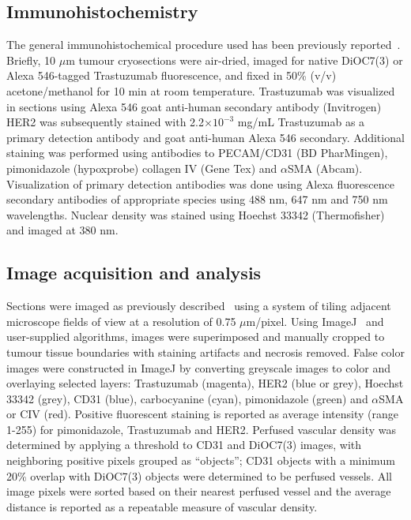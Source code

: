 \subsection{Immunohistochemistry}
The general immunohistochemical procedure used has been previously reported~\cite{Baker:2008ci}.
Briefly, 10 $\mu$m tumour cryosections were air-dried, imaged for native DiOC7(3) or Alexa 546-tagged Trastuzumab fluorescence, and fixed in 50\% (v/v) acetone/methanol for 10 min at room temperature.
Trastuzumab was visualized in sections using Alexa 546 goat anti-human secondary antibody (Invitrogen)
\acs{HER2} was subsequently stained with 2.2$\times 10^{-3}$ mg/mL Trastuzumab as a primary detection antibody and goat anti-human Alexa 546 secondary.
Additional staining was performed using antibodies to PECAM/CD31 (BD PharMingen), pimonidazole (hypoxprobe) collagen IV (Gene Tex) and $\alpha$SMA (Abcam).
Visualization of primary detection antibodies was done using Alexa fluorescence secondary antibodies of appropriate species using 488 nm, 647 nm and 750 nm wavelengths.
Nuclear density was stained using Hoechst 33342 (Thermofisher) and imaged at 380 nm.

\subsection{Image acquisition and analysis}
Sections were imaged as previously described~\cite{Kyle:2007ch} using a system of tiling adjacent microscope fields of view at a resolution of 0.75 $\mu$m/pixel.
Using ImageJ~\cite{Collins:2007jr} and user-supplied algorithms, images were superimposed and manually cropped to tumour tissue boundaries with staining artifacts and necrosis removed.
False color images were constructed in ImageJ by converting greyscale images to color and overlaying selected layers: Trastuzumab (magenta), \acs{HER2} (blue or grey), Hoechst 33342 (grey), CD31 (blue), carbocyanine (cyan), pimonidazole (green) and $\alpha$SMA or CIV (red).
Positive fluorescent staining is reported as average intensity (range 1-255) for pimonidazole, Trastuzumab and \acs{HER2}.
Perfused vascular density was determined by applying a threshold to CD31 and DiOC7(3) images, with neighboring positive pixels grouped as ``objects''; CD31 objects with a minimum 20\% overlap with DiOC7(3) objects were determined to be perfused vessels.
All image pixels were sorted based on their nearest perfused vessel and the average distance is reported as a repeatable measure of vascular density.

